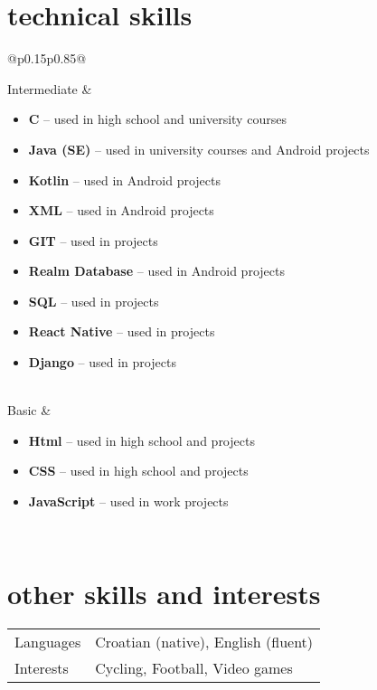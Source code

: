 \documentclass[a4paper]{article}
\makeatletter
\newlength{\tablewidth}
\newenvironment{skills}{%
\setlength{\tablewidth}{\linewidth}
\addtolength{\tablewidth}{-2\tabcolsep}
\begin{tabular}{@{}p{0.15\tablewidth}p{0.85\tablewidth}@{}}
}{%
\end{tabular}
}
\makeatother
\begin{document}
\section{technical skills}
\begin{skills}
    Intermediate &
    \begin{itemize}
    	\item \textbf{C} -- used in high school and university courses
        \item \textbf{Java (SE)} -- used in university courses and Android projects
        \item \textbf{Kotlin} -- used in Android projects
        \item \textbf{XML} -- used in Android projects
        \item \textbf{GIT} -- used in projects
        \item \textbf{Realm Database} -- used in Android projects
        \item \textbf{SQL} -- used in projects
        \item \textbf{React Native} -- used in projects
        \item \textbf{Django} -- used in projects
    \end{itemize} \\
    Basic &
    \begin{itemize}
        \item \textbf{Html} -- used in high school and projects
        \item \textbf{CSS} -- used in high school and projects
        \item \textbf{JavaScript} -- used in work projects
    \end{itemize} \\
\end{skills}

\section{other skills and interests}
\begin{skills}
    Languages & Croatian (native), English (fluent)\\
    Interests & Cycling, Football, Video games \\
\end{skills}
\end{document}
